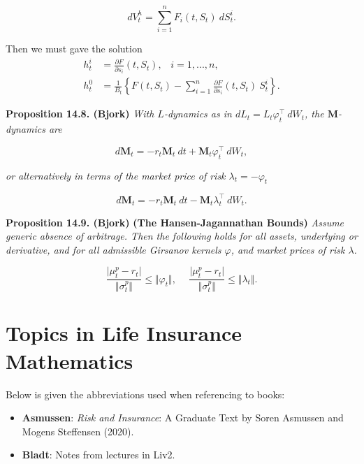 \documentclass[a4paper,12pt,openany]{book}
\providecommand{\tightlist}{%
 \setlength{\itemsep}{0pt}\setlength{\parskip}{0pt}}
\begin{document}
\[
dV_t^h=\sum_{i=1}^n F_i(t,S_t)\ dS_t^i.
\]

Then we must gave the solution
\begin{align*}
h_t^i&=\frac{\partial F}{\partial s_i}(t,S_t),\hspace{10pt}i=1,...,n,\tag{14.32}\\
h_t^0&=\frac{1}{B_t}\left\{F(t,S_t)-\sum_{i=1}^n \frac{\partial F}{\partial s_i}(t,S_t)\ S_t^i\right\}.\tag{14.33}
\end{align*}

\textbf{Proposition 14.8. (Bjork)} \emph{With \(L\)-dynamics as in \(dL_t=L_t\varphi^\top_t\ dW_t\), the \(\mathbf{M}\)-dynamics are}

\[
d\mathbf{M}_t=-r_t\mathbf{M}_t\ dt+\mathbf{M}_t\varphi_t^\top\ dW_t,\tag{14.39}
\]

\emph{or alternatively in terms of the market price of risk \(\lambda_t=-\varphi_t\)}

\[
d\mathbf{M}_t=-r_t\mathbf{M}_t\ dt-\mathbf{M}_t\lambda_t^\top\ dW_t.\tag{14.40}
\]

\textbf{Proposition 14.9. (Bjork)} \textbf{(The Hansen-Jagannathan Bounds)} \emph{Assume generic absence of arbitrage. Then the following holds for all assets, underlying or derivative, and for all admissible Girsanov kernels \(\varphi\), and market prices of risk \(\lambda\).}

\[
\frac{\vert \mu_t^p - r_t\vert}{\Vert \sigma_t ^p\Vert}\le \Vert \varphi_t\Vert,\hspace{15pt} \frac{\vert \mu_t^p - r_t\vert}{\Vert \sigma_t ^p\Vert}\le \Vert \lambda_t\Vert.\tag{14.42}
\]

\hypertarget{topics-in-life-insurance-mathematics}{%
\chapter{Topics in Life Insurance Mathematics}\label{topics-in-life-insurance-mathematics}}

Below is given the abbreviations used when referencing to books:

\begin{itemize}
\tightlist
\item
  \textbf{Asmussen}: \emph{Risk and Insurance}: A Graduate Text by Soren Asmussen and Mogens Steffensen (2020).\cite{asmussen2020}
\item
  \textbf{Bladt}: Notes from lectures in Liv2.
\end{itemize}
\end{document}
